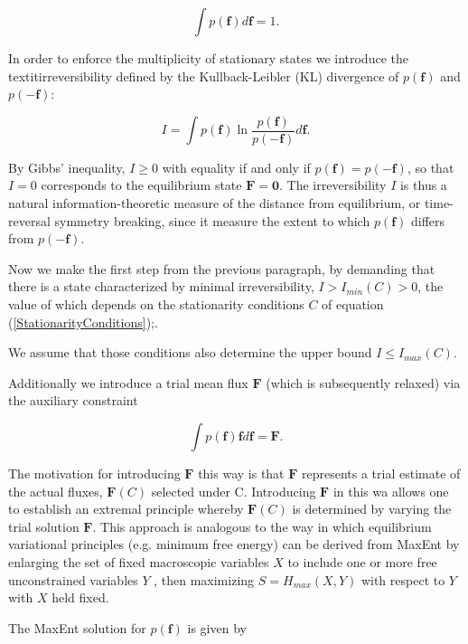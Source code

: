 \documentclass[a4paper,12pt]{article}
\begin{document}
\begin{equation}
\label{Constrain2MEP}
  \int p(\bm{f})d\bm{f} = 1.
\end{equation}

In order to enforce the multiplicity of stationary states we introduce the textit{irreversibility} defined by the Kullback-Leibler (KL) divergence of $p(\bm{f})$ and $p(-\bm{f})$:

\begin{equation}
  I= \int p(\bm{f}) \ln \frac{p(\bm{f})}{p(-\bm{f})} d\bm{f}.
\end{equation}

By Gibbs' inequality, $I \geq 0$ with equality if and only if $p(\bm{f})=p(-\bm{f})$, so that $I=0$ corresponds to the equilibrium state $\bm{F} = \bm{0} $. The irreversibility $I$ is thus a natural information-theoretic measure of the distance from equilibrium, or time-reversal symmetry breaking, since it measure the extent to which $p(\bm{f} ) $ differs from $p(\bm{-f} ) $.

Now we make the first step from the previous paragraph, by demanding that there is a state characterized by minimal irreversibility, $I>I_{min}(C)>0$, the value of which depends on the stationarity conditions $C$ of equation (\ref{StationarityConditions});.

We assume that those conditions also determine the upper bound $I \leq I_{max}(C)$.

Additionally we introduce a trial mean flux $\bm{F}$ (which is subsequently relaxed) via the auxiliary constraint

\begin{equation}
\label{Constrain3MEP}
  \int p(\bm{f})\bm{f} d\bm{f} = \bm{F}.
\end{equation}

The motivation for introducing $\bm{F}$ this way is that $\bm{F}$ represents a trial estimate of the actual fluxes, $\bm{F}(C)$ selected under C. Introducing $\bm{F}$ in this wa allows one to establish an extremal principle whereby $\bm{F}(C)$ is determined by varying the trial solution $\bm{F}$.
This approach is analogous to the way in which equilibrium variational principles (e.g. minimum free energy) can be derived from MaxEnt by enlarging the set of fixed macroscopic variables $X$ to include one or more free unconstrained variables $Y$ , then maximizing $S=H_{max}(X,Y)$ with respect to $Y$ with $X$ held fixed.

The MaxEnt solution for $p(\bm{f})$ is given by 
\end{document}
